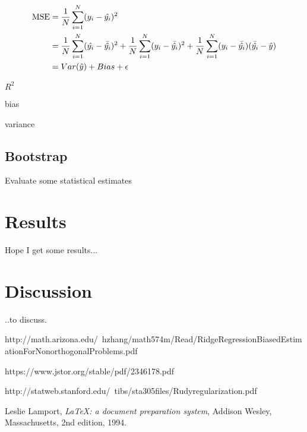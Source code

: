 \documentclass[a4paper,12pt, english]{article}
\begin{document}
\begin{align}
\textnormal{MSE} &= \frac{1}{N} \sum_{i=1}^N (y_i - \hat{y_i})^2 \\
&= \frac{1}{N} \sum_{i=1}^N (\hat{y_i} - \bar{\hat{y_i}})^2 + \frac{1}{N} \sum_{i=1}^N (y_i - \bar{\hat{y_i}})^2 + \frac{1}{N} \sum_{i=1}^N (y_i - \bar{\hat{y_i}})(\bar{\hat{y_i}} - \hat{y}) \\
&= Var(\hat{y}) + Bias + \epsilon
\end{align}

$R^2$

bias 

variance

\subsection*{Bootstrap}

Evaluate some statistical estimates

\section*{Results}

Hope I get some results...

\section*{Discussion}

..to discuss. 

http://math.arizona.edu/~hzhang/math574m/Read/RidgeRegressionBiasedEstimationForNonorthogonalProblems.pdf

https://www.jstor.org/stable/pdf/2346178.pdf

http://statweb.stanford.edu/~tibs/sta305files/Rudyregularization.pdf

\begin{thebibliography}{9}

  Leslie Lamport,
  \textit{\LaTeX: a document preparation system},
  Addison Wesley, Massachusetts,
  2nd edition,
  1994.
  


\end{thebibliography}
\end{document}
